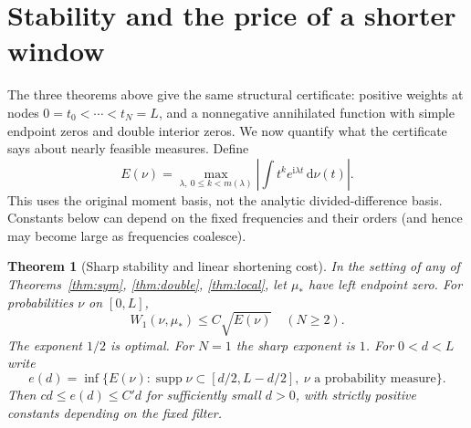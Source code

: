 \documentclass[11pt]{article}
\newtheorem{theorem}{Theorem}[section]
\theoremstyle{remark}\newtheorem{remark}[theorem]{Remark}
\newcommand{\supp}{\operatorname{supp}}
\newcommand{\dd}{\,\mathrm d}
\newcommand{\ii}{\mathrm i}
\begin{document}
\section{Stability and the price of a shorter window}\label{sec:stability}
The three theorems above give the same structural certificate: positive weights at nodes $0=t_0<\cdots<t_N=L$, and a nonnegative annihilated function with simple endpoint zeros and double interior zeros. We now quantify what the certificate says about nearly feasible measures. Define
\[
 E(\nu)=\max_{\lambda,\ 0\le k<m(\lambda)}\left|\int t^ke^{\ii\lambda t}\dd\nu(t)\right|.
\]
This uses the original moment basis, not the analytic divided-difference basis. Constants below can depend on the fixed frequencies and their orders (and hence may become large as frequencies coalesce).
\begin{theorem}[Sharp stability and linear shortening cost]\label{thm:stable}
In the setting of any of Theorems~\ref{thm:sym}, \ref{thm:double}, \ref{thm:local}, let $\mu_*$ have left endpoint zero. For probabilities $\nu$ on $[0,L]$,
\[
 W_1(\nu,\mu_*)\le C\sqrt{E(\nu)}\quad(N\ge2).
\]
The exponent $1/2$ is optimal. For $N=1$ the sharp exponent is $1$. For $0<d<L$ write
\[
 e(d)=\inf\{E(\nu):\supp\nu\subset[d/2,L-d/2],\ \nu\text{ a probability measure}\}.
\]
Then $c d\le e(d)\le C' d$ for sufficiently small $d>0$, with strictly positive constants depending on the fixed filter.
\end{theorem}
\end{document}
